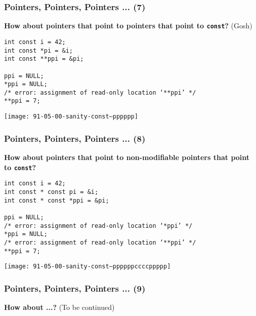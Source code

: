 \begin{frame}[fragile]
  \frametitle{Pointers, Pointers, Pointers ... (7)}

  \textbf{How about pointers that point to pointers that point to
    \texttt{const}?} (Gosh)

  \begin{block}{}
\begin{verbatim}
int const i = 42;
int const *pi = &i;
int const **ppi = &pi;

ppi = NULL;
*ppi = NULL;
/* error: assignment of read-only location ‘**ppi’ */
**ppi = 7;
\end{verbatim}
  \end{block}

  \begin{block}{}
    \texttt{[image: 91-05-00-sanity-const--pppppp]}
  \end{block}

\end{frame}

\begin{frame}[fragile]
  \frametitle{Pointers, Pointers, Pointers ... (8)}

  \textbf{How about pointers that point to non-modifiable pointers
    that point to \texttt{const}?}

  \begin{block}{}
\begin{verbatim}
int const i = 42;
int const * const pi = &i;
int const * const *ppi = &pi;

ppi = NULL;
/* error: assignment of read-only location ‘*ppi’ */
*ppi = NULL;
/* error: assignment of read-only location ‘**ppi’ */
**ppi = 7;
\end{verbatim}
  \end{block}

  \begin{block}{}
    \texttt{[image: 91-05-00-sanity-const--ppppppccccppppp]}
  \end{block}

\end{frame}

\begin{frame}
  \frametitle{Pointers, Pointers, Pointers ... (9)}

  \textbf{How about ...?} (To be continued)

\end{frame}


